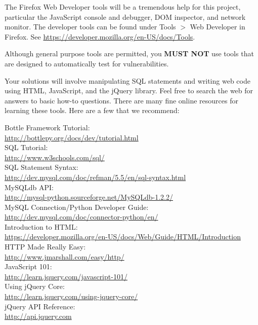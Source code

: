 \documentclass[letterpaper,12pt]{report}
\begin{document}
The Firefox Web Developer tools will be a tremendous help for this project, particular the JavaScript console and debugger, DOM inspector, and network monitor.  The developer tools can be found under Tools $>$ Web Developer in Firefox.  See \url{https://developer.mozilla.org/en-US/docs/Tools}.

\smallskip

Although general purpose tools are permitted, you \textbf{MUST NOT} use tools that are designed to automatically test for vulnerabilities.

\medskip

Your solutions will involve manipulating SQL statements and writing web code using HTML, JavaScript, and the jQuery library.  Feel free to search the web for answers to basic how-to questions.  There are many fine online resources for learning these tools.  Here are a few that we recommend:
\medskip

Bottle Framework Tutorial:\\
\url{http://bottlepy.org/docs/dev/tutorial.html} \\
SQL Tutorial:\\
\url{http://www.w3schools.com/sql/} \\
SQL Statement Syntax:\\
\url{http://dev.mysql.com/doc/refman/5.5/en/sql-syntax.html} \\
MySQLdb API:\\
\url{http://mysql-python.sourceforge.net/MySQLdb-1.2.2/} \\
MySQL Connection/Python Developer Guide:\\
\url{http://dev.mysql.com/doc/connector-python/en/} \\
Introduction to HTML:\\ \url{https://developer.mozilla.org/en-US/docs/Web/Guide/HTML/Introduction} \\
HTTP Made Really Easy:\\
\url{http://www.jmarshall.com/easy/http/} \\
JavaScript 101:\\
\url{http://learn.jquery.com/javascript-101/} \\
Using jQuery Core:\\ 
\url{http://learn.jquery.com/using-jquery-core/} \\
jQuery API Reference:\\
\url{http://api.jquery.com} \\

\bigskip
\end{document}

